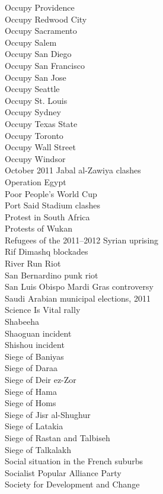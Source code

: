 Occupy Providence\\
Occupy Redwood City\\
Occupy Sacramento\\
Occupy Salem\\
Occupy San Diego\\
Occupy San Francisco\\
Occupy San Jose\\
Occupy Seattle\\
Occupy St. Louis\\
Occupy Sydney\\
Occupy Texas State\\
Occupy Toronto\\
Occupy Wall Street\\
Occupy Windsor\\
October 2011 Jabal al-Zawiya clashes\\
Operation Egypt\\
Poor People's World Cup\\
Port Said Stadium clashes\\
Protest in South Africa\\
Protests of Wukan\\
Refugees of the 2011–2012 Syrian uprising\\
Rif Dimashq blockades\\
River Run Riot\\
San Bernardino punk riot\\
San Luis Obispo Mardi Gras controversy\\
Saudi Arabian municipal elections, 2011\\
Science Is Vital rally\\
Shabeeha\\
Shaoguan incident\\
Shishou incident\\
Siege of Baniyas\\
Siege of Daraa\\
Siege of Deir ez-Zor\\
Siege of Hama\\
Siege of Homs\\
Siege of Jisr al-Shughur\\
Siege of Latakia\\
Siege of Rastan and Talbiseh\\
Siege of Talkalakh\\
Social situation in the French suburbs\\
Socialist Popular Alliance Party\\
Society for Development and Change\\
